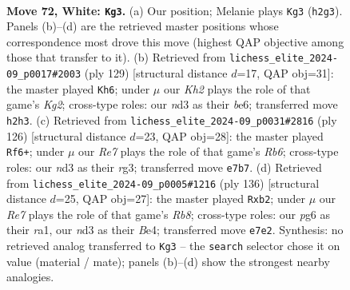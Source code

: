 \documentclass[11pt]{article}
\begin{document}
\clearpage

\begin{figure}[p]\centering
\begin{subfigure}{0.46\textwidth}\centering
\resizebox{\linewidth}{!}{%
\newchessgame
\chessboard[
  setfen={8/1p2R2p/1k4pP/5p2/p4P2/3n4/7K/8 w - - 0 72},
  showmover=false,
  pgfstyle=straightmove, color=movearrow, markmove={h2-g3}
]}
\caption{}
\end{subfigure}\hfill
\begin{subfigure}{0.46\textwidth}\centering
\resizebox{\linewidth}{!}{%
\newchessgame
\chessboard[
  setfen={8/6k1/4Bp2/p7/P3P2P/1P1r2P1/5K2/8 b - - 20 65},
  showmover=false,
  pgfstyle=straightmove, color=movearrow, markmove={g7-h6}
]}
\caption{}
\end{subfigure}
\\[4pt]
\begin{subfigure}{0.46\textwidth}\centering
\resizebox{\linewidth}{!}{%
\newchessgame
\chessboard[
  setfen={8/5k2/1R4p1/p3p1Pp/4P3/6r1/2PK4/8 w - - 3 64},
  showmover=false,
  pgfstyle=straightmove, color=movearrow, markmove={b6-f6}
]}
\caption{}
\end{subfigure}\hfill
\begin{subfigure}{0.46\textwidth}\centering
\resizebox{\linewidth}{!}{%
\newchessgame
\chessboard[
  setfen={1R6/5p2/5kpp/8/4B1PP/8/1p3K2/r7 w - - 16 69},
  showmover=false,
  pgfstyle=straightmove, color=movearrow, markmove={b8-b2}
]}
\caption{}
\end{subfigure}
\caption{\textbf{Move 72, White: \texttt{Kg3}.} (a) Our position; Melanie plays \texttt{Kg3} (\texttt{h2g3}). Panels (b)--(d) are the retrieved master positions whose correspondence most drove this move (highest QAP objective among those that transfer to it). (b) Retrieved from \texttt{lichess\_elite\_2024-09\_p0017\#2003} (ply 129) [structural distance $d$=17, QAP obj=31]: the master played \texttt{Kh6}; under $\mu$ our \emph{Kh2} plays the role of that game's \emph{Kg2}; cross-type roles: our \emph{n}d3 as their \emph{b}e6; transferred move \texttt{h2h3}. (c) Retrieved from \texttt{lichess\_elite\_2024-09\_p0031\#2816} (ply 126) [structural distance $d$=23, QAP obj=28]: the master played \texttt{Rf6+}; under $\mu$ our \emph{Re7} plays the role of that game's \emph{Rb6}; cross-type roles: our \emph{n}d3 as their \emph{r}g3; transferred move \texttt{e7b7}. (d) Retrieved from \texttt{lichess\_elite\_2024-09\_p0005\#1216} (ply 136) [structural distance $d$=25, QAP obj=27]: the master played \texttt{Rxb2}; under $\mu$ our \emph{Re7} plays the role of that game's \emph{Rb8}; cross-type roles: our \emph{p}g6 as their \emph{r}a1, our \emph{n}d3 as their \emph{B}e4; transferred move \texttt{e7e2}. Synthesis: no retrieved analog transferred to \texttt{Kg3} -- the \texttt{search} selector chose it on value (material / mate); panels (b)--(d) show the strongest nearby analogies.}
\label{fig:thought-m142}
\end{figure}
\end{document}
